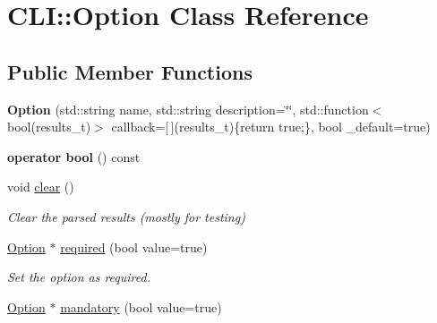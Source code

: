 \hypertarget{class_c_l_i_1_1_option}{}\section{C\+LI\+:\+:Option Class Reference}
\label{class_c_l_i_1_1_option}
\subsection*{Public Member Functions}
\begin{DoxyCompactItemize}
\item 
\mbox{\label{class_c_l_i_1_1_option_a2ea1f937d3537b3f06f6fe723ab271c4}} 
{\bfseries Option} (std\+::string name, std\+::string description=\char`\"{}\char`\"{}, std\+::function$<$ bool(results\+\_\+t)$>$ callback=\mbox{[}$\,$\mbox{]}(results\+\_\+t)\{return true;\}, bool \+\_\+default=true)
\item 
\mbox{\label{class_c_l_i_1_1_option_ab73e846fb3a78ac7eff8b6cd6afb24a1}} 
{\bfseries operator bool} () const
\item 
\mbox{\label{class_c_l_i_1_1_option_abbd36aaff5cdca8b10346bafed51da39}} 
void \hyperlink{class_c_l_i_1_1_option_abbd36aaff5cdca8b10346bafed51da39}{clear} ()
\begin{DoxyCompactList}\small\item\em Clear the parsed results (mostly for testing) \end{DoxyCompactList}\item 
\mbox{\label{class_c_l_i_1_1_option_a950395187e95aec210928b36e90621bb}} 
\hyperlink{class_c_l_i_1_1_option}{Option} $\ast$ \hyperlink{class_c_l_i_1_1_option_a950395187e95aec210928b36e90621bb}{required} (bool value=true)
\begin{DoxyCompactList}\small\item\em Set the option as required. \end{DoxyCompactList}\item 
\mbox{\label{class_c_l_i_1_1_option_a04d6a400482ecaa08cc5b3a93f0ca93c}} 
\hyperlink{class_c_l_i_1_1_option}{Option} $\ast$ \hyperlink{class_c_l_i_1_1_option_a04d6a400482ecaa08cc5b3a93f0ca93c}{mandatory} (bool value=true)

\end{DoxyCompactItemize}

